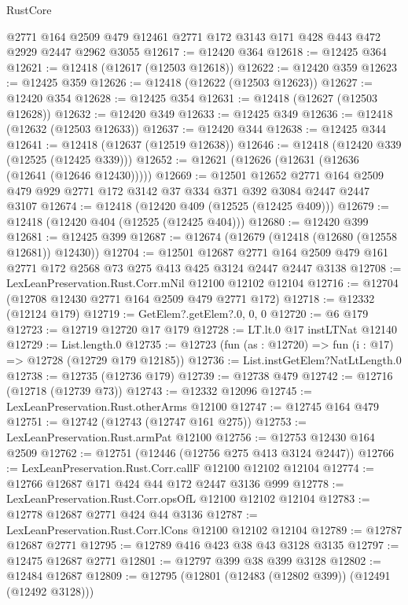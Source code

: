\begin{lexlean}{RustCore}
\begin{coremodule}
    @2771
    @164
    @2509
    @479
    @12461
    @2771
    @172
    @3143
    @171
    @428
    @443
    @472
    @2929
    @2447
    @2962
    @3055
@12617 := @12420 @364
@12618 := @12425 @364
@12621 := @12418 (@12617 (@12503 @12618))
@12622 := @12420 @359
@12623 := @12425 @359
@12626 := @12418 (@12622 (@12503 @12623))
@12627 := @12420 @354
@12628 := @12425 @354
@12631 := @12418 (@12627 (@12503 @12628))
@12632 := @12420 @349
@12633 := @12425 @349
@12636 := @12418 (@12632 (@12503 @12633))
@12637 := @12420 @344
@12638 := @12425 @344
@12641 := @12418 (@12637 (@12519 @12638))
@12646 := @12418 (@12420 @339 (@12525 (@12425 @339)))
@12652 := @12621 (@12626 (@12631 (@12636 (@12641 (@12646 @12430)))))
@12669 := @12501
    @12652
    @2771
    @164
    @2509
    @479
    @929
    @2771
    @172
    @3142
    @37
    @334
    @371
    @392
    @3084
    @2447
    @2447
    @3107
@12674 := @12418 (@12420 @409 (@12525 (@12425 @409)))
@12679 := @12418 (@12420 @404 (@12525 (@12425 @404)))
@12680 := @12420 @399
@12681 := @12425 @399
@12687 := @12674 (@12679 (@12418 (@12680 (@12558 @12681)) @12430))
@12704 := @12501
    @12687
    @2771
    @164
    @2509
    @479
    @161
    @2771
    @172
    @2568
    @73
    @275
    @413
    @425
    @3124
    @2447
    @2447
    @3138
@12708 := LexLeanPreservation.Rust.Corr.mNil @12100 @12102 @12104
@12716 := @12704 (@12708 @12430 @2771 @164 @2509 @479 @2771 @172)
@12718 := @12332 (@12124 @179)
@12719 := GetElem?.getElem?.{0, 0, 0}
@12720 := @6 @179
@12723 := @12719 @12720 @17 @179
@12728 := LT.lt.{0} @17 instLTNat @12140
@12729 := List.length.{0}
@12735 := @12723 (fun (as : @12720) => fun (i : @17) => @12728 (@12729 @179 @12185))
@12736 := List.instGetElem?NatLtLength.{0}
@12738 := @12735 (@12736 @179)
@12739 := @12738 @479
@12742 := @12716 (@12718 (@12739 @73))
@12743 := @12332 @12096
@12745 := LexLeanPreservation.Rust.otherArms @12100
@12747 := @12745 @164 @479
@12751 := @12742 (@12743 (@12747 @161 @275))
@12753 := LexLeanPreservation.Rust.armPat @12100
@12756 := @12753 @12430 @164 @2509
@12762 := @12751 (@12446 (@12756 @275 @413 @3124 @2447))
@12766 := LexLeanPreservation.Rust.Corr.callF @12100 @12102 @12104
@12774 := @12766 @12687 @171 @424 @44 @172 @2447 @3136 @999
@12778 := LexLeanPreservation.Rust.Corr.opsOfL @12100 @12102 @12104
@12783 := @12778 @12687 @2771 @424 @44 @3136
@12787 := LexLeanPreservation.Rust.Corr.lCons @12100 @12102 @12104
@12789 := @12787 @12687 @2771
@12795 := @12789 @416 @423 @38 @43 @3128 @3135
@12797 := @12475 @12687 @2771
@12801 := @12797 @399 @38 @399 @3128
@12802 := @12484 @12687
@12809 := @12795 (@12801 (@12483 (@12802 @399)) (@12491 (@12492 @3128)))

\end{coremodule}
\end{lexlean}
